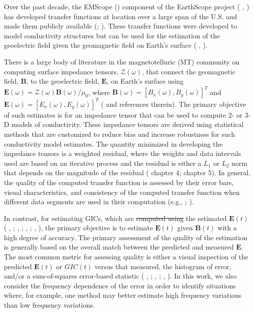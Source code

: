 \documentclass[12pt]{article}
\newcommand{\citeay}[1]{%
\citeauthor{#1}, \citeyear{#1}%
}
\providecommand{\DIFadd}[1]{{\protect\color{blue}\uwave{#1}}} %
\providecommand{\DIFdel}[1]{{\protect\color{red}\sout{#1}}}                      %
\providecommand{\DIFaddbegin}{} %
\providecommand{\DIFaddend}{} %
\providecommand{\DIFdelbegin}{} %
\providecommand{\DIFdelend}{} %
\begin{document}
Over the past decade, the EMScope (\cite{Schultz2009}) component of the EarthScope project (\citeay{Meltzer2003}) has developed transfer functions at location over a large span of the U.S. and made them publicly available (\cite{Kelbert2011}; \cite{Schultz2016}).  These transfer functions were developed to model conductivity structures but can be used for the estimation of the geoelectric field given the geomagnetic field on Earth's surface (\citeay{Bedrosian2015}).

There is a large body of literature in the magnetotelluric (MT) community on computing surface impedance tensors, $\mathcal{Z}(\omega)$, that connect the geomagnetic field, $\mathbf{B}$, to the geoelectric field, $\mathbf{E}$, on Earth's surface using $\mathbf{E}(\omega) = \mathcal{Z}(\omega)\mathbf{B}(\omega)/\mu_0$, where $\mathbf{B}(\omega) = [B_x(\omega),B_y(\omega)]^T$ and $\mathbf{E}(\omega) = [E_x(\omega),E_y(\omega)]^T$ (\cite{Chave2012} and references therein).  The primary objective of such estimates is for an impedance tensor that can be used to compute 2- or 3-D models of conductivity. These impedance tensors are derived using statistical methods that are customized to reduce bias and increase robustness for such conductivity model estimates.  The quantity minimized in developing the impedance tensors is a weighted residual, where the weights and data intervals used are based on an iterative process and the residual is either a $L_1$ or $L_2$ norm that depends on the magnitude of the residual (\cite{Simpson2005} chapter 4; \cite{Chave2012} chapter 5).  In general, the quality of the computed transfer function is assessed by their error bars, visual characteristics, and consistency of the computed transfer function when different data segments are used in their computation (e.g., \cite{Jones1989}; \cite{Fujii2015}).

In contrast, for estimating GICs, which are \DIFdelbegin \DIFdel{computed using }\DIFdelend \DIFaddbegin \DIFadd{typically computed using a linear relationship to }\DIFaddend the estimated $\mathbf{E}(t)$ (\citeay{Lehtinen1985}; \citeay{Pulkkinen2010}; \citeay{Viljanen2012}; \citeay{NERC2015}), the primary objective is to estimate $\mathbf{E}(t)$ given $\mathbf{B}(t)$ with a high degree of accuracy.  The primary assessment of the quality of the estimation is generally based on the overall match between the predicted and measured $\mathbf{E}$.  The most common metric for assessing quality is either a visual inspection of the predicted $\mathbf{E}(t)$ or $GIC(t)$ versus that measured, the histogram of error, and/or a sum-of-squares error-based statistic  (\citeay{McKay2003}; \citeay{Pulkkinen2010}; \citeay{Love2014}).  In this work, we also consider the frequency dependence of the error in order to identify situations where, for example, one method may better estimate high frequency variations than low frequency variations.
\end{document}
